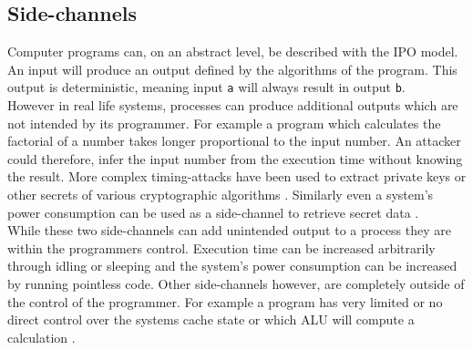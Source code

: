 \documentclass[conference,compsoc,final,a4paper]{IEEEtran}
\begin{document}
\subsection{Side-channels}
Computer programs can, on an abstract level, be described with the \ac{IPO} model. An input will produce an output defined by the algorithms of the program. This output is deterministic, meaning input \lstinline|a| will always result in output \lstinline|b|. \\
However in real life systems, processes can produce additional outputs which are not intended by its programmer. For example a program which calculates the factorial of a number takes longer proportional to the input number. An attacker could therefore, infer the input number from the execution time without knowing the result. More complex timing-attacks have been used to extract private keys or other secrets of various cryptographic algorithms \cite{bernstein2005cache}\cite{kocher1996timing}. Similarly even a system's power consumption can be used as a side-channel to retrieve secret data \cite{kocher1999differential}. \\
While these two side-channels can add unintended output to a process they are within the programmers control. Execution time can be increased arbitrarily through idling or sleeping and the system's power consumption can be increased by running pointless code. Other side-channels however, are completely outside of the control of the programmer. For example a program has very limited or no direct control over the systems cache state or which \ac{ALU} will compute a calculation \cite{kocher2018spectre}.
\end{document}

